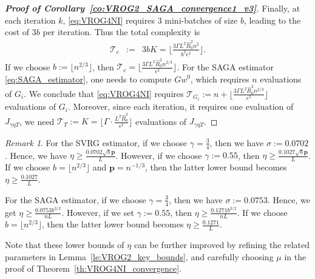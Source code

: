 \documentclass{article}
\newcommand{\Tc}{\mathcal{T}}
\newcommand{\mbf}[1]{\mathbf{#1}}
\theoremstyle{plain}
\theoremstyle{definition}
\theoremstyle{remark}
\newtheorem{remark}[theorem]{Remark}
\begin{document}
\begin{proof}[\textbf{Proof of Corollary~\ref{co:VROG2_SAGA_convergence1_v3}}]
Finally,  at each iteration $k$, \eqref{eq:VROG4NI} requires $3$ mini-batches of size $b$, leading to the cost of $3b$ per iteration.
Thus the total complexity is 
\begin{equation*}
\begin{array}{lcl}
\Tc_{c} & := &  3bK = \big\lfloor \frac{ 3\Gamma L^2 \hat{R}_0^2 n^2 }{ b^2 \epsilon^2} \big\rfloor.
\end{array}
\end{equation*}
If we choose $b := \lfloor n^{2/3} \rfloor$, then $\Tc_{c} = \big\lfloor \frac{3\Gamma  L^2 \hat{R}_0^2 n^{2/3} }{\epsilon^2} \big\rfloor$.
For the SAGA estimator \eqref{eq:SAGA_estimator}, one needs to compute $Gw^0$, which requires $n$ evaluations of $G_i$.
We conclude that \eqref{eq:VROG4NI} requires $\Tc_{G_i} := n + \big\lfloor \frac{3\Gamma L^2 \hat{R}_0^2  n^{2/3}  }{\epsilon^2} \big\rfloor$ evaluations of $G_i$.
Moreover, since each iteration, it requires one evaluation of $J_{\gamma\eta T}$, we need $\Tc_T := K =  \big\lfloor \Gamma \cdot \frac{L^2 \hat{R}_0^2}{ \epsilon^2} \big\rfloor$ evaluations of $J_{\gamma\eta T}$.
\end{proof}

\begin{remark}\label{re:lower_bounds_of_eta}
For the SVRG estimator, if we choose $\gamma = \frac{3}{4}$, then we have $\sigma := 0.0702$.
Hence, we have $\eta \geq \frac{0.0702 \sqrt{b}\mbf{p}}{L}$.
However, if we choose $\gamma := 0.55$, then $\eta \geq \frac{0.1027\sqrt{b}\mbf{p}}{L}$.
If we choose $b = \lfloor n^{2/3}\rfloor$ and $\mbf{p} = n^{-1/3}$, then the latter lower bound becomes $\eta \geq \frac{0.1027}{L}$.

For the SAGA estimator, if we choose $\gamma = \frac{3}{4}$, then we have $\sigma := 0.0753$.
Hence, we get $\eta \geq \frac{0.0753 b^{3/2}}{nL}$.
However, if we set $\gamma := 0.55$, then $\eta \geq \frac{0.1271 b^{3/2}}{nL}$.
If we choose $b = \lfloor n^{2/3}\rfloor$, then the latter lower bound becomes $\eta \geq \frac{0.1271}{L}$.

Note that these lower bounds of $\eta$ can be further improved by refining the related parameters in Lemma~\ref{le:VROG2_key_bounds}, and carefully choosing $\mu$ in the proof of Theorem~\ref{th:VROG4NI_convergence}.
\end{remark}
\end{document}
